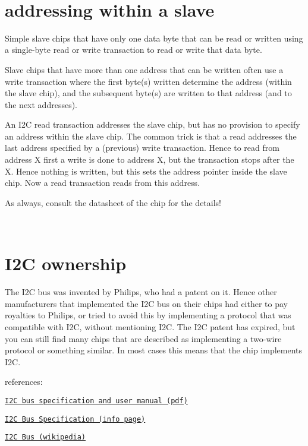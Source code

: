 ~\newline
 

\hypertarget{i2c_i2c-addressing}{}\section{addressing within a slave}\label{i2c_i2c-addressing}
Simple slave chips that have only one data byte that can be read or written using a single-\/byte read or write transaction to read or write that data byte.

Slave chips that have more than one address that can be written often use a write transaction where the first byte(s) written determine the address (within the slave chip), and the subsequent byte(s) are written to that address (and to the next addresses).

An I2C read transaction addresses the slave chip, but has no provision to specify an address within the slave chip. The common trick is that a read addresses the last address specified by a (previous) write transaction. Hence to read from address X first a write is done to address X, but the transaction stops after the X. Hence nothing is written, but this sets the address pointer inside the slave chip. Now a read transaction reads from this address.

As always, consult the datasheet of the chip for the details!

~\newline
 

\hypertarget{i2c_i2c-ownership}{}\section{I2\+C ownership}\label{i2c_i2c-ownership}
The I2C bus was invented by Philips, who had a patent on it. Hence other manufacturers that implemented the I2C bus on their chips had either to pay royalties to Philips, or tried to avoid this by implementing a protocol that was compatible with I2C, without mentioning I2C. The I2C patent has expired, but you can still find many chips that are described as \textquotesingle{}implementing a two-\/wire protocol\textquotesingle{} or something similar. In most cases this means that the chip implements I2C.

references\+:
\begin{DoxyItemize}
\item \href{http://www.nxp.com/documents/user_manual/UM10204.pdf}{\tt I2C bus specification and user manual (pdf)}
\item \href{http://i2c.info/i2c-bus-specification}{\tt I2C Bus Specification (info page)}
\item \href{https://en.wikipedia.org/wiki/I2C}{\tt I2C Bus (wikipedia)}
\end{DoxyItemize}

